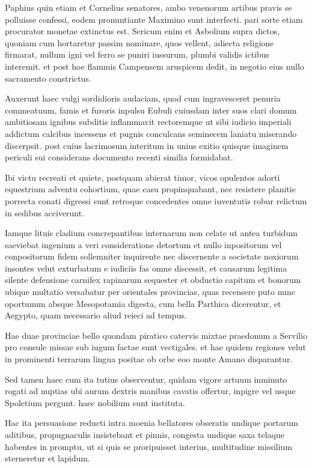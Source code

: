 

Paphius quin etiam et Cornelius senatores, ambo venenorum artibus pravis se polluisse confessi, eodem pronuntiante Maximino sunt interfecti. pari sorte etiam procurator monetae extinctus est. Sericum enim et Asbolium supra dictos, quoniam cum hortaretur passim nominare, quos vellent, adiecta religione firmarat, nullum igni vel ferro se puniri iussurum, plumbi validis ictibus interemit. et post hoe flammis Campensem aruspicem dedit, in negotio eius nullo sacramento constrictus.

Auxerunt haec vulgi sordidioris audaciam, quod cum ingravesceret penuria commeatuum, famis et furoris inpulsu Eubuli cuiusdam inter suos clari domum ambitiosam ignibus subditis inflammavit rectoremque ut sibi iudicio imperiali addictum calcibus incessens et pugnis conculcans seminecem laniatu miserando discerpsit. post cuius lacrimosum interitum in unius exitio quisque imaginem periculi sui considerans documento recenti similia formidabat.

Ibi victu recreati et quiete, postquam abierat timor, vicos opulentos adorti equestrium adventu cohortium, quae casu propinquabant, nec resistere planitie porrecta conati digressi sunt retroque concedentes omne iuventutis robur relictum in sedibus acciverunt.

Iamque lituis cladium concrepantibus internarum non celate ut antea turbidum saeviebat ingenium a veri consideratione detortum et nullo inpositorum vel conpositorum fidem sollemniter inquirente nec discernente a societate noxiorum insontes velut exturbatum e iudiciis fas omne discessit, et causarum legitima silente defensione carnifex rapinarum sequester et obductio capitum et bonorum ubique multatio versabatur per orientales provincias, quas recensere puto nunc oportunum absque Mesopotamia digesta, cum bella Parthica dicerentur, et Aegypto, quam necessario aliud reieci ad tempus.

Hae duae provinciae bello quondam piratico catervis mixtae praedonum a Servilio pro consule missae sub iugum factae sunt vectigales. et hae quidem regiones velut in prominenti terrarum lingua positae ob orbe eoo monte Amano disparantur.

Sed tamen haec cum ita tutius observentur, quidam vigore artuum inminuto rogati ad nuptias ubi aurum dextris manibus cavatis offertur, inpigre vel usque Spoletium pergunt. haec nobilium sunt instituta.

Hac ita persuasione reducti intra moenia bellatores obseratis undique portarum aditibus, propugnaculis insistebant et pinnis, congesta undique saxa telaque habentes in promptu, ut si quis se proripuisset interius, multitudine missilium sterneretur et lapidum.


